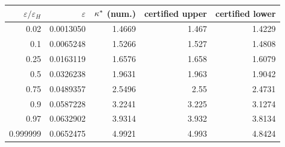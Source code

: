 \begin{tabular}{@{}rrrrr@{}}
\toprule
$\varepsilon/\varepsilon_H$ & $\varepsilon$ & $\kappa^{*}$ (num.) & certified upper & certified lower \\
\midrule
0.02 & 0.0013050 & 1.4669 & 1.467 & 1.4229 \\
0.1 & 0.0065248 & 1.5266 & 1.527 & 1.4808 \\
0.25 & 0.0163119 & 1.6576 & 1.658 & 1.6079 \\
0.5 & 0.0326238 & 1.9631 & 1.963 & 1.9042 \\
0.75 & 0.0489357 & 2.5496 & 2.55 & 2.4731 \\
0.9 & 0.0587228 & 3.2241 & 3.225 & 3.1274 \\
0.97 & 0.0632902 & 3.9314 & 3.932 & 3.8134 \\
0.999999 & 0.0652475 & 4.9921 & 4.993 & 4.8424 \\
\bottomrule
\end{tabular}
